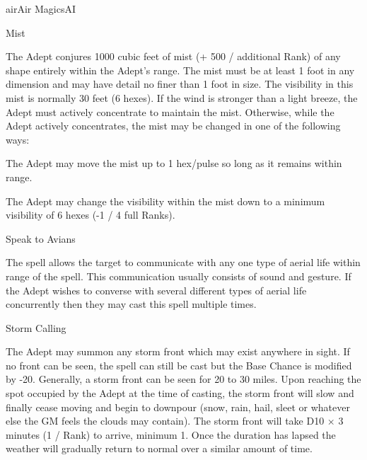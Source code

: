 \begin{College}[2.1]{air}{Air Magics}{AI}
\begin{spell}[G-4]{Mist}

\begin{effects}
The Adept conjures 1000 cubic feet of mist (+ 500 / additional Rank)
of any shape entirely within the Adept’s range. The mist must be at
least 1 foot in any dimension and may have detail no finer than 1 foot
in size. The visibility in this mist is normally 30 feet (6 hexes).
If the wind is stronger than a light breeze, the Adept must actively
concentrate to maintain the mist. Otherwise, while the Adept actively
concentrates, the mist may be changed in one of the following ways:
\begin{Enumerate}
\item The Adept may move the mist up to 1 hex/pulse so long as it
  remains within range.

\item The Adept may change the visibility within the mist down to a
  minimum visibility of 6 hexes (-1 / 4 full Ranks).
\end{Enumerate}
\end{effects}
\end{spell}

\begin{spell}[G-5]{Speak to Avians}

\begin{effects}
The spell allows the target to communicate with any one type of aerial
life within range of the spell.  This communication usually consists
of sound and gesture. If the Adept wishes to converse with several
different types of aerial life concurrently then they may cast this
spell multiple times.
\end{effects}
\end{spell}

\begin{spell}[G-6]{Storm Calling}

\begin{effects}
The Adept may summon any storm front which may exist anywhere in
sight. If no front can be seen, the spell can still be cast but the
Base Chance is modified by -20.  Generally, a storm front can be seen
for 20 to 30 miles. Upon reaching the spot occupied by the Adept at
the time of casting, the storm front will slow and finally cease
moving and begin to downpour (snow, rain, hail, sleet or whatever else
the GM feels the clouds may contain).  The storm front will take D10 ×
3 minutes (1 / Rank) to arrive, minimum 1.  Once the duration has
lapsed the weather will gradually return to normal over a similar
amount of time.
\end{effects}
\end{spell}


\end{College}
